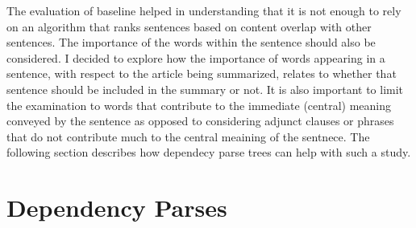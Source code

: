 
The evaluation of baseline helped in understanding that it is not enough to rely on an algorithm that ranks sentences based on content overlap with other sentences.
The importance of the words within the sentence should also be considered.
I decided to explore how the importance of words appearing in a sentence, with respect to the article being summarized, relates to whether that sentence should be included in the summary or not.
It is also important to limit the examination to words that contribute to the immediate (central) meaning conveyed by the sentence as opposed to considering adjunct clauses or phrases that do not contribute much to the central meaining of the sentnece.
The following section describes how dependecy parse trees can help with such a study.

\section*{Dependency Parses}
